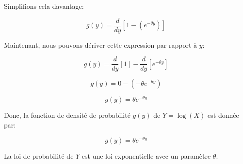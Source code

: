 \documentclass[11pt]{beamer}
\begin{document}
\begin{frame}
	
	Simplifions cela davantage:
	
	\[ g(y) = \frac{d}{dy} [1 - (e^{-\theta y})] \]
	
	Maintenant, nous pouvons dériver cette expression par rapport à $y$:
	
	\[ g(y) = \frac{d}{dy} [1] - \frac{d}{dy} [e^{-\theta y}] \]
	
	\[ g(y) = 0 - (-\theta e^{-\theta y}) \]
	
	\[ g(y) = \theta e^{-\theta y} \]
	
	Donc, la fonction de densité de probabilité $g(y)$ de $Y = \log(X)$ est donnée par:
	
	\[ g(y) = \theta e^{-\theta y} \]
	
	La loi de probabilité de $Y$ est une loi exponentielle avec un paramètre $\theta$.
	
\end{frame}
\end{document}
